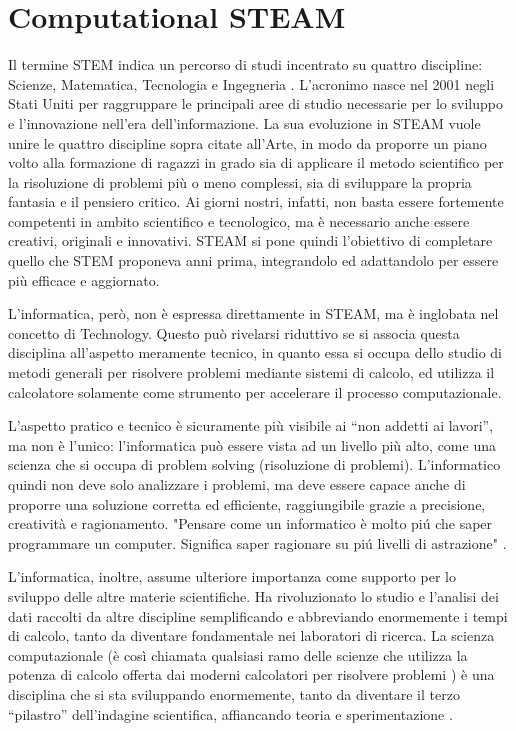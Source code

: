 \newpage
\chapter{Computational STEAM}
\label{chap:steam}
Il termine STEM indica un percorso di studi incentrato su quattro discipline: Scienze, Matematica, Tecnologia e Ingegneria \cite{stem}. L’acronimo nasce nel 2001 negli Stati Uniti per raggruppare le principali aree di studio necessarie per lo sviluppo e l’innovazione nell’era dell’informazione. La sua evoluzione in STEAM vuole unire le quattro discipline sopra citate all’Arte, in modo da proporre un piano volto alla formazione di ragazzi in grado sia di applicare il metodo scientifico per la risoluzione di problemi più o meno complessi, sia di sviluppare la propria fantasia e il pensiero critico. Ai giorni nostri, infatti, non basta essere fortemente competenti in ambito scientifico e tecnologico, ma è necessario anche essere creativi, originali e innovativi. STEAM si pone quindi l’obiettivo di completare quello che STEM proponeva anni prima, integrandolo ed adattandolo per essere più efficace e aggiornato. 

L’informatica, però, non è espressa direttamente in STEAM, ma è inglobata nel concetto di Technology. Questo può rivelarsi riduttivo se si associa questa disciplina all’aspetto meramente tecnico, in quanto essa si occupa dello studio di metodi generali per risolvere problemi mediante sistemi di calcolo, ed utilizza il calcolatore solamente come strumento \cite{informatica} per accelerare il processo computazionale.

L’aspetto pratico e tecnico è sicuramente più visibile ai “non addetti ai lavori”, ma non è l’unico: l’informatica può essere vista ad un livello più alto, come una scienza che si occupa di problem solving (risoluzione di problemi). L’informatico quindi non deve solo analizzare i problemi, ma deve essere capace anche di proporre una soluzione corretta ed efficiente, raggiungibile grazie a precisione, creatività e ragionamento. "Pensare come un informatico è molto piú che saper programmare un computer. Significa saper ragionare su piú livelli di astrazione" \cite{wing}.

L’informatica, inoltre, assume ulteriore importanza come supporto per lo sviluppo delle altre materie scientifiche. Ha rivoluzionato lo studio e l’analisi dei dati raccolti da altre discipline semplificando e abbreviando enormemente i tempi di calcolo, tanto da diventare fondamentale nei laboratori di ricerca. La scienza computazionale (è così chiamata qualsiasi ramo delle scienze che utilizza la potenza di calcolo offerta dai moderni calcolatori per risolvere problemi \cite{computational_science}) è una disciplina che si sta sviluppando enormemente, tanto da diventare il terzo “pilastro” dell’indagine scientifica, affiancando teoria e sperimentazione \cite{ensuring_america_competitivness}.

